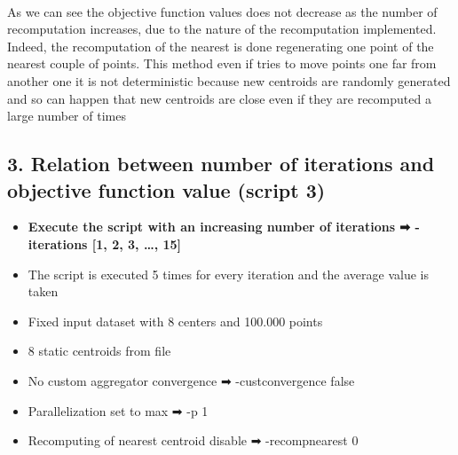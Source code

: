 \documentclass[11pt]{article}
\providecommand{\tightlist}{%
      \setlength{\itemsep}{0pt}\setlength{\parskip}{0pt}}
\begin{document}
    \begin{center}
    \end{center}
    { \hspace*{\fill} \\}
    
    As we can see the objective function values does not decrease as the
number of recomputation increases, due to the nature of the
recomputation implemented. Indeed, the recomputation of the nearest is
done regenerating one point of the nearest couple of points. This method
even if tries to move points one far from another one it is not
deterministic because new centroids are randomly generated and so can
happen that new centroids are close even if they are recomputed a large
number of times

    \hypertarget{relation-between-number-of-iterations-and-objective-function-value-script-3}{%
\subsection{3. Relation between number of iterations and objective
function value (script
3)}\label{relation-between-number-of-iterations-and-objective-function-value-script-3}}

\begin{itemize}
\tightlist
\item
  \textbf{Execute the script with an increasing number of iterations ➡
  -iterations {[}1, 2, 3, \ldots{}, 15{]}}
\item
  The script is executed 5 times for every iteration and the average
  value is taken
\item
  Fixed input dataset with 8 centers and 100.000 points
\item
  8 static centroids from file
\item
  No custom aggregator convergence ➡ -custconvergence false
\item
  Parallelization set to max ➡ -p 1
\item
  Recomputing of nearest centroid disable ➡ -recompnearest 0
\end{itemize}
\end{document}
